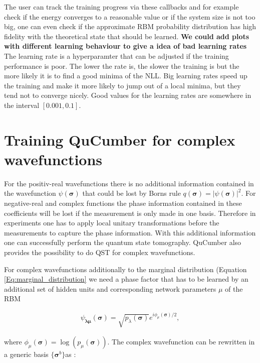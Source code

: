\documentclass[submission, Phys]{SciPost}
\begin{document}
The user can track the training progress via these callbacks and for example check if the energy converges to a reasonable value or if the system size is not too big, one can even check if the approximate RBM probability distribution has high fidelity with the theoretical state that should be learned.
\textbf{We could add plots with different learning behaviour to give a idea of bad learning rates}
The learning rate is a hyperparamter that can be adjusted if the training performance is poor. The lower the rate is, the slower the training is but the more likely it is to find a good minima of the NLL. Big learning rates speed up the training and make it more likely to jump out of a local minima, but they tend not to converge nicely. Good values for the learning rates are somewhere in the interval $[0.001, 0.1 ]$.

\section{Training QuCumber for complex wavefunctions}
\label{Sec:Training_QuCumber_on_complex_wavefunctions}

For the positiv-real wavefunctions there is no additional information contained in the wavefunction $\psi( \boldsymbol{\sigma})$ that could be lost by Borns rule $q(\boldsymbol{\sigma}) = | \psi( \boldsymbol{\sigma} ) |^2$. For negative-real and complex functions the phase information contained in these coefficients will be lost if the measurement is only made in one basis. Therefore in experiments one has to apply local unitary transformations before the measurements to capture the phase information. With this additional information one can successfully perform the quantum state tomography.
QuCumber also provides the possibility to do QST for complex wavefunctions.

For complex wavefunctions additionally to the marginal distribution (Equation \ref{Eq:marginal_distribution} we need a phase factor that has to be learned by an additional set of hidden units and corresponding network parameters $\mu$ of the RBM

\begin{align}
\psi_{\bm{\lambda} \bm{\mu}} (\bm{\sigma})= \sqrt{p_{\lambda} (\bm{\sigma})} e^{i \phi_{\mu} (\bm{\sigma})/2},
\end{align}

where $\phi_{\mu}(\bm{\sigma}) = \log (p_{\mu} (\bm{\sigma}))$. The complex wavefunction can be rewritten in a generic basis $\{ \bm{\sigma}^b \}$as :
\end{document}
